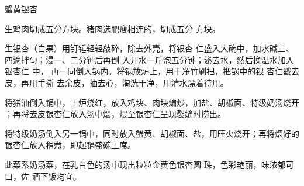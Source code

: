 \begin{recipe}{蟹黄银杏}

\ingredients



\preparation

\step 生鸡肉切成五分方块。猪肉选肥瘦相连的，切成五分 方块。

\step 生银杏（白果）用钉锤轻轻敲碎，除去外壳，将银杏 仁盛入大碗中，加水碱三、
四滴拌匀；浸一、二分钟后再倒 入开水一斤泡五分钟；泌去水，然后换温水加入银杏仁
中， 再一同倒入锅内。将锅放炉上，用干净竹刷把，把锅中的银 杏仁戳去皮，再用手撕
去余皮，抽去心，淘洗干净，用清水漂着待用。

\step 将猪油倒入锅中，上炉烧红，放入鸡块、肉块煸炒，加盐、胡椒面、特级奶汤烧开
；再将去皮银杏仁放入汤中煨，煨至银杏仁呈现裂缝时捞出。

\step 将特级奶汤倒入另一锅中，同时放入蟹黄、胡椒面、盐，用旺火烧开；再将煨好的
银杏仁放入稍煮，即起锅盛碗上席。

\features

此菜系奶汤菜，在乳白色的汤中现出粒粒金黄色银杏圆 珠，色彩艳丽，味浓郁可口，佐
酒下饭均宜。

\end{recipe}

